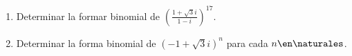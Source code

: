 \begin{enunciado}{\ejercicio}

  \begin{enumerate}[label=\roman*)]
    \item Determinar la formar binomial de
          $ \left(\frac{1 + \sqrt{3} i }{1 - i} \right)^{17}$.

    \item Determinar la forma binomial de
          $(-1 + \sqrt{3}i)^n$ para cada $n \en \naturales$.
  \end{enumerate}

\end{enunciado}
